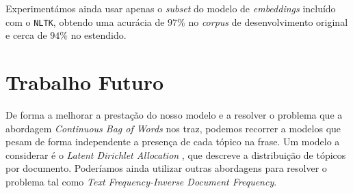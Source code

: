 \documentclass[a4paper,twocolumn]{article}
\begin{document}
Experimentámos ainda usar apenas o \textit{subset} do modelo de \textit{embeddings} incluído com o \texttt{NLTK}, obtendo uma acurácia de $97\%$ no \textit{corpus} de desenvolvimento original e cerca de $94\%$ no estendido. 

\section{Trabalho Futuro}
De forma a melhorar a prestação do nosso modelo e a resolver o problema que a abordagem \textit{Continuous Bag of Words} nos traz, podemos recorrer a modelos que pesam de forma independente a presença de cada tópico na frase. Um modelo a considerar é o \textit{Latent Dirichlet Allocation} \cite{DBLP:conf/nips/BleiNJ01}, que descreve a distribuição de tópicos por documento. Poderíamos ainda utilizar outras abordagens para resolver o problema tal como \textit{Text Frequency-Inverse Document Frequency}.



\end{document}
